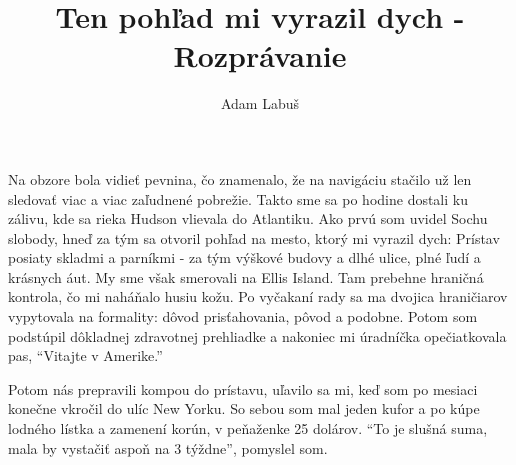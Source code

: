\documentclass[12pt, a4paper]{article}
\title{%
	Ten pohľad mi vyrazil dych - Rozprávanie
}
\author{Adam Labuš}
\begin{document}
	\maketitle
Na obzore bola vidieť pevnina, čo znamenalo, že na navigáciu stačilo už len sledovať viac a viac zaľudnené pobrežie.
Takto sme sa po hodine dostali ku zálivu, kde sa rieka Hudson vlievala do Atlantiku.
Ako prvú som uvidel Sochu slobody, hneď za tým sa otvoril pohľad na mesto, ktorý mi vyrazil dych:
Prístav posiaty skladmi a parníkmi - za tým výškové budovy a dlhé ulice, plné ľudí a krásnych áut.
My sme však smerovali na Ellis Island.
Tam prebehne hraničná kontrola, čo mi naháňalo husiu kožu.
Po vyčakaní rady sa ma dvojica hraničiarov vypytovala na formality: dôvod prisťahovania, pôvod a podobne.
Potom som podstúpil dôkladnej zdravotnej prehliadke a nakoniec mi úradníčka opečiatkovala pas, \enquote{Vitajte v Amerike.}

Potom nás prepravili kompou do prístavu, uľavilo sa mi, keď som po mesiaci konečne vkročil do ulíc New Yorku. So sebou som mal jeden kufor a po kúpe lodného lístka a zamenení korún, v peňaženke 25 dolárov. 
\enquote{To je slušná suma, mala by vystačiť aspoň na 3 týždne}, pomyslel som.
\end{document}

